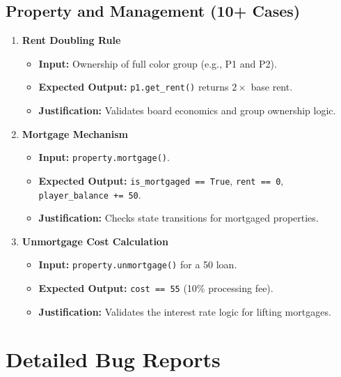 \documentclass{article}
\begin{document}
\subsection{Property and Management (10+ Cases)}
\begin{enumerate}
    \item \textbf{Rent Doubling Rule}
    \begin{itemize}
        \item \textbf{Input:} Ownership of full color group (e.g., P1 and P2).
        \item \textbf{Expected Output:} \texttt{p1.get_rent()} returns $2 \times$ base rent.
        \item \textbf{Justification:} Validates board economics and group ownership logic.
    \end{itemize}

    \item \textbf{Mortgage Mechanism}
    \begin{itemize}
        \item \textbf{Input:} \texttt{property.mortgage()}.
        \item \textbf{Expected Output:} \texttt{is_mortgaged == True}, \texttt{rent == 0}, \texttt{player_balance += 50}.
        \item \textbf{Justification:} Checks state transitions for mortgaged properties.
    \end{itemize}

    \item \textbf{Unmortgage Cost Calculation}
    \begin{itemize}
        \item \textbf{Input:} \texttt{property.unmortgage()} for a 50 loan.
        \item \textbf{Expected Output:} \texttt{cost == 55} (10\% processing fee).
        \item \textbf{Justification:} Validates the interest rate logic for lifting mortgages.
    \end{itemize}
\end{enumerate}

\section{Detailed Bug Reports}
\end{document}
